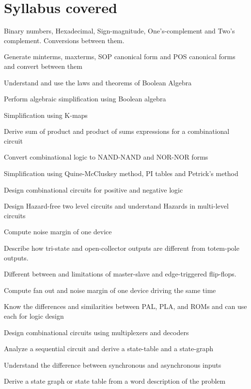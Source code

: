 

\section{Syllabus covered}
\begin{todolist}
  \item[\done] Binary numbers, Hexadecimal, Sign-magnitude, One's-complement and
    Two's complement. Conversions between them.
  \item[\done] Generate minterms, maxterms, SOP canonical form and POS
    canonical forms and convert between them\\
  \item[\done]  Understand and use the laws and theorems of Boolean Algebra
  \item[\done]  Perform algebraic simplification using Boolean algebra
  \item[\done]  Simplification using K-maps
  \item[\done]  Derive sum of product and product of sums expressions for a combinational circuit
  \item[\done]  Convert combinational logic to NAND-NAND and NOR-NOR forms
  \item[\done]  Simplification using Quine-McCluskey method, PI tables and Petrick's method
  \item  Design combinational circuits for positive and negative logic
  \item  Design Hazard-free two level circuits and understand Hazards in multi-level circuits
  \item Compute noise margin of one device
  \item Describe how tri-state and open-collector outputs are different from totem-pole outputs.
  \item Different between and limitations of master-slave and edge-triggered flip-flops.
  \item Compute fan out and noise margin of one device driving the same time
  \item Know the differences and similarities between PAL, PLA, and ROMs and can use each for logic design
  \item Design combinational circuits using multiplexers and decoders
  \item Analyze a sequential circuit and derive a state-table and a state-graph
  \item Understand the difference between synchronous and asynchronous inputs
  \item Derive a state graph or state table from a word description of the problem

\end{todolist}
